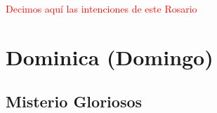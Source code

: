 \documentclass[10pt,twoside]{book}
\begin{document}
\begin{paracol}{2}
      \begin{leftcolumn*}
            
      \end{leftcolumn*}
      \begin{otherlanguage}{latin}
            \begin{rightcolumn}
                
            \end{rightcolumn}
      \end{otherlanguage}

      \begin{leftcolumn*}
            
      \end{leftcolumn*}
      \begin{otherlanguage}{latin}
            \begin{rightcolumn}
                
            \end{rightcolumn}
      \end{otherlanguage}
\end{paracol}

\vspace{0.5em}

\begin{center}
      \textcolor{red}{Decimos aquí las intenciones de este Rosario}
\end{center}

\section*{\centering Dominica (Domingo)}

\noindent\subsection*{Misterio Gloriosos}



\vspace{0.5em}



\vspace{0.75em}


\end{document}

